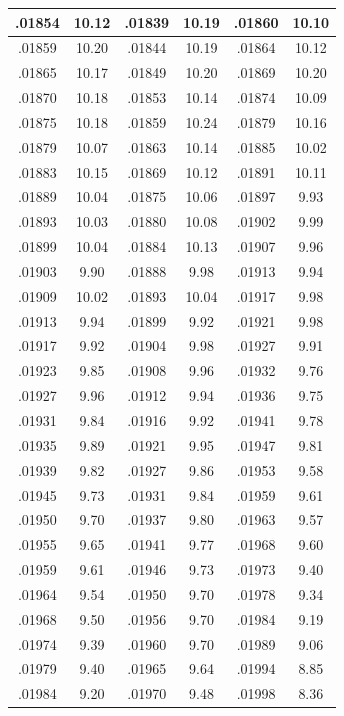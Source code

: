 \documentclass[11pt]{report}
\begin{document}
\begin{appendices}
\begin{longtable}{|c|c||c|c||c|c|}
.01854 & 10.12 & .01839 & 10.19 & .01860 & 10.10\\\hline
.01859 & 10.20 & .01844 & 10.19 & .01864 & 10.12\\\hline
.01865 & 10.17 & .01849 & 10.20 & .01869 & 10.20\\\hline
.01870 & 10.18 & .01853 & 10.14 & .01874 & 10.09\\\hline
.01875 & 10.18 & .01859 & 10.24 & .01879 & 10.16\\\hline
.01879 & 10.07 & .01863 & 10.14 & .01885 & 10.02\\\hline
.01883 & 10.15 & .01869 & 10.12 & .01891 & 10.11\\\hline
.01889 & 10.04 & .01875 & 10.06 & .01897 & 9.93\\\hline
.01893 & 10.03 & .01880 & 10.08 & .01902 & 9.99\\\hline
.01899 & 10.04 & .01884 & 10.13 & .01907 & 9.96\\\hline
.01903 & 9.90 & .01888 & 9.98 & .01913 & 9.94\\\hline
.01909 & 10.02 & .01893 & 10.04 & .01917 & 9.98\\\hline
.01913 & 9.94 & .01899 & 9.92 & .01921 & 9.98\\\hline
.01917 & 9.92 & .01904 & 9.98 & .01927 & 9.91\\\hline
.01923 & 9.85 & .01908 & 9.96 & .01932 & 9.76\\\hline
.01927 & 9.96 & .01912 & 9.94 & .01936 & 9.75\\\hline
.01931 & 9.84 & .01916 & 9.92 & .01941 & 9.78\\\hline
.01935 & 9.89 & .01921 & 9.95 & .01947 & 9.81\\\hline
.01939 & 9.82 & .01927 & 9.86 & .01953 & 9.58\\\hline
.01945 & 9.73 & .01931 & 9.84 & .01959 & 9.61\\\hline
.01950 & 9.70 & .01937 & 9.80 & .01963 & 9.57\\\hline
.01955 & 9.65 & .01941 & 9.77 & .01968 & 9.60\\\hline
.01959 & 9.61 & .01946 & 9.73 & .01973 & 9.40\\\hline
.01964 & 9.54 & .01950 & 9.70 & .01978 & 9.34\\\hline
.01968 & 9.50 & .01956 & 9.70 & .01984 & 9.19\\\hline
.01974 & 9.39 & .01960 & 9.70 & .01989 & 9.06\\\hline
.01979 & 9.40 & .01965 & 9.64 & .01994 & 8.85\\\hline
.01984 & 9.20 & .01970 & 9.48 & .01998 & 8.36\\\hline

\end{longtable}
\end{appendices}
\end{document}
